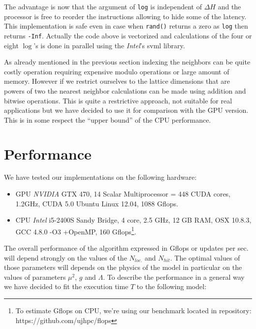 \documentclass[a4paper]{llncs}
\newcommand{\code}[1]{\lstinline!#1!}
\begin{document}
The advantage is now that the argument of \code{log} is independent of $\Delta
H$ and the processor is free to reorder the instructions allowing to hide some
of the latency. This implementation is safe even in case when \code{rand()}
returns a zero as \code{log} then returns {\tt -Inf}. Actually the code above
is vectorized and calculations of the four or eight $\log$'s is done in
parallel using the \emph{Intel}'s svml library\cite{svml}.

As already mentioned in the previous section indexing the neighbors can be
quite costly operation requiring expensive modulo operations or large amount of
memory. However if we restrict ourselves to the lattice dimensions that are
powers of two the nearest neighbor calculations can be made using addition and
bitwise operations. This is quite a restrictive approach, not suitable for real
applications but we have decided to use it for comparison with the GPU version.
This is in some respect the ``upper bound'' of the CPU performance.


\section{Performance}
\label{sec:performance}

We have tested our implementations on  the following hardware:
\begin{itemize}

\item GPU \emph{NVIDIA} GTX 470, 14 Scalar Multiprocessor = 448 CUDA cores,
1.2GHz, CUDA 5.0 Ubuntu Linux 12.04, 1088 Gflops.

\item CPU \emph{Intel} i5-2400S Sandy Bridge, 4 core, 2.5 GHz, 12 GB RAM, OSX
10.8.3, GCC 4.8.0 -O3 +OpenMP, 160 Gflops\footnote{To estimate Gflops on CPU,
we're using our benchmark located in repository:
https://github.com/ujhpc/flops}.

\end{itemize}

The overall performance of the algorithm expressed in Gflops or updates per
sec. will depend strongly on the values of the $N_{loc.}$ and $N_{hit}$. The
optimal values of those parameters will depends on the physics of the model in
particular on the values of parameters $\mu^2$, $g$ and $\Lambda$. To describe
the performance in a general way we have decided to fit the execution time $T$
to the following model:
\end{document}
